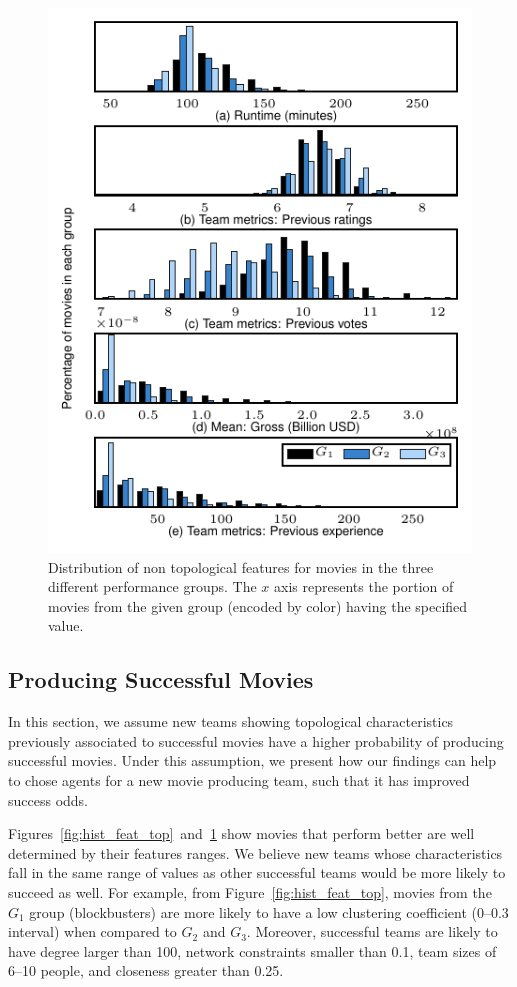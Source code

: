 \begin{figure}[H]\begin{center}
\includegraphics[width=0.78\columnwidth]{../../images/features_hist_ntop.pdf}
\caption{\label{fig:hist_feat_ntop}Distribution of non topological features for
movies in the three different performance groups. The $x$ axis represents the
portion of movies from the given group (encoded by color) having the specified
value.}
\end{center}\end{figure}

\subsection{Producing Successful Movies}
\label{sec:future}
In this section, we assume new teams showing topological characteristics
previously associated to successful movies have a higher probability of
producing successful movies. Under this assumption, we present how our findings
can help to chose agents for a new movie producing team, such that it has
improved success odds.

Figures~\ref{fig:hist_feat_top}~and~\ref{fig:hist_feat_ntop} show movies that
perform better are well determined by their features ranges.  We believe new
teams whose characteristics fall in the same range of values as other
successful teams would be more likely to succeed as well. For example, from
Figure~\ref{fig:hist_feat_top}, movies from the $G_1$ group (blockbusters) are
more likely to have a low clustering coefficient (0--0.3 interval) when
compared to $G_2$ and $G_3$. Moreover, successful teams are likely to have
degree larger than 100, network constraints smaller than 0.1, team sizes of
6--10 people, and closeness greater than 0.25.

